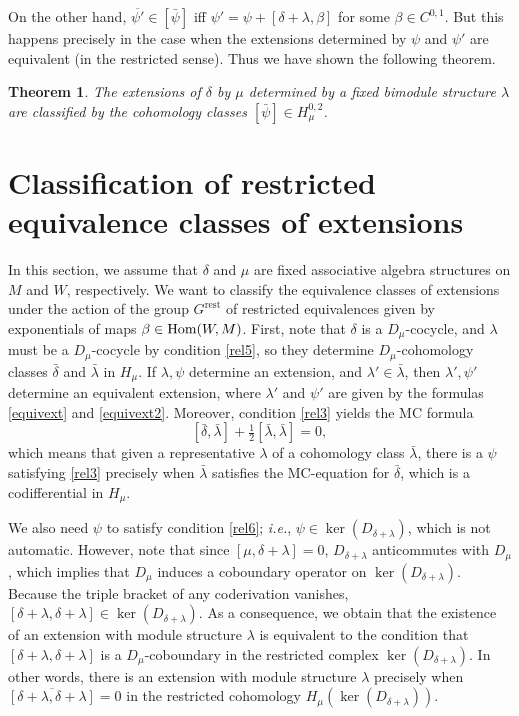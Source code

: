 \documentclass[12pt]{amsart}
\newtheorem{thm}{Theorem}[section]
\theoremstyle{definition}
\begin{document}
On the other hand, $\overline{\psi'}\in [\bar\psi]$ iff
$\psi'=\psi+[\delta+\lambda,\beta]$ for some $\beta\in C^{0,1}$. But this happens precisely in the
case when the extensions determined by $\psi$ and $\psi'$ are equivalent (in the restricted sense).
Thus we have shown the following theorem.
\begin{thm}
The extensions of $\delta$ by $\mu$ determined by a fixed bimodule structure $\lambda$ are
classified by
the cohomology classes $[\bar\psi]\in H^{0,2}_\mu$.
\end{thm}
\section{Classification of restricted equivalence classes of
extensions}\label{sec6} In this section, we assume that $\delta$ and
$\mu$ are fixed associative algebra structures on $M$ and $W$,
respectively. We want to classify the equivalence classes of
extensions under the action of the group ${\mbox{$G^{\text{rest}}$}}$ of restricted
equivalences given by exponentials of maps $\beta\in{\mbox{\rm Hom}}(W,M)$.
First, note that $\delta$ is a $D_\mu$-cocycle, and $\lambda$ must
be a $D_\mu$-cocycle by condition \eqref{rel5}, so they determine
$D_\mu$-cohomology classes $\bar\delta$ and $\bar\lambda$ in ${H_\mu}$.
If $\lambda,\psi$ determine an extension, and
$\lambda'\in\bar\lambda$, then $\lambda',\psi'$ determine an
equivalent extension, where $\lambda'$ and $\psi'$ are given by the
formulas \eqref{equivext} and \eqref{equivext2}.  Moreover,
condition \eqref{rel3} yields the MC formula
\begin{equation}\label{mcind}
[\bar\delta,\bar\lambda]+\tfrac12[\bar\lambda,\bar\lambda]=0,
\end{equation}
which means that given a representative $\lambda$ of a cohomology class $\bar\lambda$,
there is a $\psi$ satisfying \eqref{rel3} precisely when
$\bar\lambda$ satisfies the MC-equation for
$\bar\delta$, which is a codifferential in ${H_\mu}$.

We also need $\psi$ to satisfy condition \eqref{rel6};
{\hbox{\it i.e.}}, $\psi\in\ker(D_{\delta+\lambda})$,
which is not automatic. However, note that since $[\mu,\delta+\lambda]=0$, $D_{\delta+\lambda}$ anticommutes with $D_\mu$,
which  implies that
$D_\mu$ induces a coboundary operator on $\ker(D_{\delta+\lambda})$.
Because the triple bracket of any coderivation vanishes,
$[\delta+\lambda,\delta+\lambda]\in \ker(D_{\delta+\lambda})$. As a consequence, we obtain
that the existence of an extension with module structure $\lambda$
is equivalent to the condition that $[\delta+\lambda,\delta+\lambda]$ is a
$D_\mu$-coboundary in the restricted complex $\ker(D_{\delta+\lambda})$. In other words, there is an
extension with module structure $\lambda$ precisely when
$\overline{[\delta+\lambda,\delta+\lambda]}=0$
in the restricted cohomology ${H_\mu(\ker(D_{\delta+\lambda}))}$.
\end{document}
